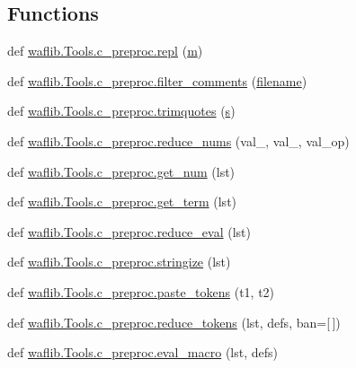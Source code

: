 \subsection*{Functions}
\begin{DoxyCompactItemize}
\item 
def \hyperlink{namespacewaflib_1_1_tools_1_1c__preproc_adca973b334d8f88d92fb16d2e3000874}{waflib.\+Tools.\+c\+\_\+preproc.\+repl} (\hyperlink{layer3_8c_a4b8bfe70f28d6faddcb10d6ecf8c1989}{m})
\item 
def \hyperlink{namespacewaflib_1_1_tools_1_1c__preproc_a010e1e8b176d25dddad67e70e5c987bf}{waflib.\+Tools.\+c\+\_\+preproc.\+filter\+\_\+comments} (\hyperlink{test__portburn_8cpp_a7efa5e9c7494c7d4586359300221aa5d}{filename})
\item 
def \hyperlink{namespacewaflib_1_1_tools_1_1c__preproc_abf61cd16ee0a918d873b4d37072168dd}{waflib.\+Tools.\+c\+\_\+preproc.\+trimquotes} (\hyperlink{lib_2expat_8h_a755339d27872b13735c2cab829e47157}{s})
\item 
def \hyperlink{namespacewaflib_1_1_tools_1_1c__preproc_abec7f42c251d7b5e4cf212a1443b4952}{waflib.\+Tools.\+c\+\_\+preproc.\+reduce\+\_\+nums} (val\+\_, val\+\_, val\+\_\+op)
\item 
def \hyperlink{namespacewaflib_1_1_tools_1_1c__preproc_a1e1d64d777ae7a4b10b8e6cf26c095c2}{waflib.\+Tools.\+c\+\_\+preproc.\+get\+\_\+num} (lst)
\item 
def \hyperlink{namespacewaflib_1_1_tools_1_1c__preproc_a0871a7c3384ec9b371a2e10971221423}{waflib.\+Tools.\+c\+\_\+preproc.\+get\+\_\+term} (lst)
\item 
def \hyperlink{namespacewaflib_1_1_tools_1_1c__preproc_adb7e6106ee0e6ef4d060264355319a4e}{waflib.\+Tools.\+c\+\_\+preproc.\+reduce\+\_\+eval} (lst)
\item 
def \hyperlink{namespacewaflib_1_1_tools_1_1c__preproc_a81c768b64f09d0c576cc069a767cd114}{waflib.\+Tools.\+c\+\_\+preproc.\+stringize} (lst)
\item 
def \hyperlink{namespacewaflib_1_1_tools_1_1c__preproc_a477752b5879e38da8d12a6e1499c2544}{waflib.\+Tools.\+c\+\_\+preproc.\+paste\+\_\+tokens} (t1, t2)
\item 
def \hyperlink{namespacewaflib_1_1_tools_1_1c__preproc_a6de48629bec374961e7f95bb46b098d6}{waflib.\+Tools.\+c\+\_\+preproc.\+reduce\+\_\+tokens} (lst, defs, ban=\mbox{[}$\,$\mbox{]})
\item 
def \hyperlink{namespacewaflib_1_1_tools_1_1c__preproc_a968a8591aff3c156e76348bdf1e3ce0c}{waflib.\+Tools.\+c\+\_\+preproc.\+eval\+\_\+macro} (lst, defs)

\end{DoxyCompactItemize}
